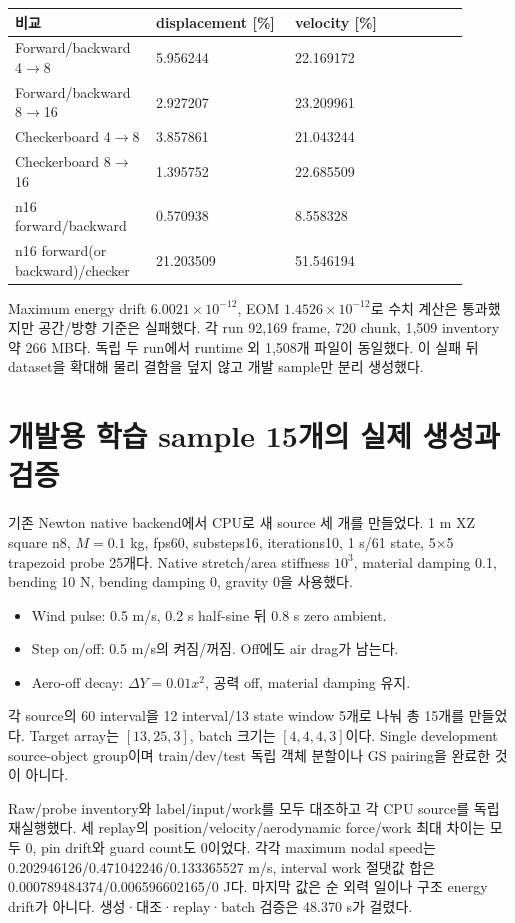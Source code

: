 \documentclass[10pt]{article}
\begin{document}
\begin{longtable}{L{0.27\linewidth}L{0.28\linewidth}L{0.35\linewidth}}
\toprule 비교 & displacement [\%] & velocity [\%]\\\midrule
Forward/backward 4$\to$8 & 5.956244 & 22.169172\\
Forward/backward 8$\to$16 & 2.927207 & 23.209961\\
Checkerboard 4$\to$8 & 3.857861 & 21.043244\\
Checkerboard 8$\to$16 & 1.395752 & 22.685509\\
n16 forward/backward & 0.570938 & 8.558328\\
n16 forward(or backward)/checker & 21.203509 & 51.546194\\
\bottomrule\end{longtable}

Maximum energy drift \(6.0021\times10^{-12}\), EOM \(1.4526\times10^{-12}\)로
수치 계산은 통과했지만 공간/방향 기준은 실패했다. 각 run 92,169 frame, 720 chunk,
1,509 inventory 약 266 MB다. 독립 두 run에서 runtime 외 1,508개 파일이 동일했다.
이 실패 뒤 dataset을 확대해 물리 결함을 덮지 않고 개발 sample만 분리 생성했다.

\section{개발용 학습 sample 15개의 실제 생성과 검증}

기존 Newton native backend에서 CPU로 새 source 세 개를 만들었다.
1 m XZ square n8, \(M=0.1\) kg, fps60, substeps16, iterations10, 1 s/61 state,
5$\times$5 trapezoid probe 25개다. Native stretch/area stiffness \(10^3\), material damping 0.1,
bending 10 N, bending damping 0, gravity 0을 사용했다.
\begin{itemize}
 \item Wind pulse: 0.5 m/s, 0.2 s half-sine 뒤 0.8 s zero ambient.
 \item Step on/off: 0.5 m/s의 켜짐/꺼짐. Off에도 air drag가 남는다.
 \item Aero-off decay: \(\Delta Y=0.01x^2\), 공력 off, material damping 유지.
\end{itemize}
각 source의 60 interval을 12 interval/13 state window 5개로 나눠 총 15개를 만들었다.
Target array는 \([13,25,3]\), batch 크기는 \([4,4,4,3]\)이다.
Single development source-object group이며 train/dev/test 독립 객체 분할이나 GS pairing을 완료한 것이 아니다.

Raw/probe inventory와 label/input/work를 모두 대조하고 각 CPU source를 독립 재실행했다.
세 replay의 position/velocity/aerodynamic force/work 최대 차이는 모두 0,
pin drift와 guard count도 0이었다. 각각 maximum nodal speed는
0.202946126/0.471042246/0.133365527 m/s,
interval work 절댓값 합은 0.000789484374/0.006596602165/0 J다.
마지막 값은 순 외력 일이나 구조 energy drift가 아니다.
생성·대조·replay·batch 검증은 48.370 s가 걸렸다.
\end{document}
